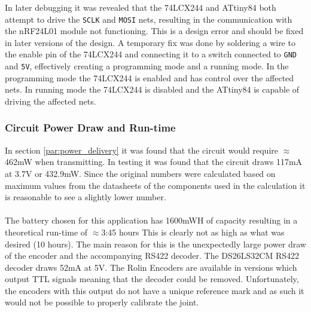 In later debugging it was revealed that the 74LCX244 and ATtiny84 both attempt to drive the \texttt{SCLK} and \texttt{MOSI} nets, resulting in the communication with the nRF24L01 module not functioning.
This is a design error and should be fixed in later versions of the design.
A temporary fix was done by soldering a wire to the enable pin of the 74LCX244 and connecting it to a switch connected to \texttt{GND} and \texttt{5V}, effectively creating a programming mode and a running mode.
In the programming mode the 74LCX244 is enabled and has control over the affected nets.
In running mode the 74LCX244 is disabled and the ATtiny84 is capable of driving the affected nets.
\subsubsection{Circuit Power Draw and Run-time} %
\label{ssub:circuit_power_draw_and_runtime}
In section \ref{par:power_delivery} it was found that the circuit would require $\approx$462mW when transmitting.
In testing it was found that the circuit draws 117mA at 3.7V or 432.9mW.
Since the original numbers were calculated based on maximum values from the datasheets of the components used in the calculation it is reasonable to see a slightly lower number.
\\~\\
The battery chosen for this application has 1600mWH of capacity resulting in a theoretical run-time of $\approx$3:45 hours
This is clearly not as high as what was desired (10 hours).
The main reason for this is the unexpectedly large power draw of the encoder and the accompanying RS422 decoder.
The DS26LS32CM RS422 decoder draws 52mA at 5V.
The Rolin Encoders are available in versions which output TTL signals meaning that the decoder could be removed. 
Unfortunately, the encoders with this output do not have a unique reference mark and as such it would not be possible to properly calibrate the joint.
